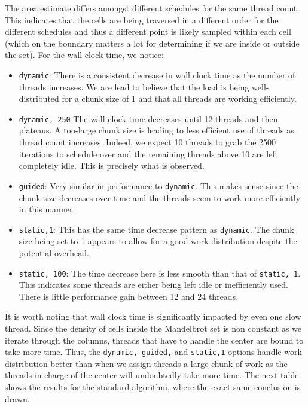 \documentclass{article}
\begin{document}
\noindent The area estimate differs amongst different schedules for the same thread count. This 
indicates that the cells are being traversed in a different order for the different schedules 
and thus a different point is likely sampled within each cell (which on the boundary matters 
a lot for determining if we are inside or outside the set). For the wall clock time, we notice:
\begin{itemize}
    \item \texttt{dynamic}: There is a consistent decrease in wall clock time as
    the number of threads increases. We are lead to believe that the load is 
    being well-distributed for a chunk size of 1 and that all threads are working efficiently.
    \item \texttt{dynamic, 250} The wall clock time decreases until 12 threads 
    and then plateaus. A too-large chunk size is leading to less efficient use of 
    threads as thread count increases. Indeed, we expect 10 threads to grab the 
    2500 iterations to schedule over and the remaining threads above 10 are left completely idle. This 
    is precisely what is observed.
    \item \texttt{guided}: Very similar in performance to \texttt{dynamic}. This 
    makes sense since the chunk size decreases over time and the threads seem 
    to work more efficiently in this manner.
    \item \texttt{static,1}: This has the same time decrease pattern as \texttt{dynamic}. 
    The chunk size being set to 1 appears to allow for a good work distribution despite the 
    potential overhead.
    \item \texttt{static, 100}: The time decrease here is less smooth than that of 
    \texttt{static, 1}. This indicates some threads are either being left idle or 
    inefficiently used. There is little performance gain between 12 and 24 threads.
\end{itemize}
It is worth noting that wall clock time is significantly impacted by even one slow thread. 
Since the density of cells inside the Mandelbrot set is non constant as we iterate through the columns, 
threads that have to handle the center are bound to take more time. Thus, the 
\texttt{dynamic, guided,} and \texttt{static,1} options handle work distribution better than 
when we assign threads a large chunk of work as the threads in charge of the center will undoubtedly take more time.
The next table shows the results for the standard algorithm, where the exact same conclusion is drawn.
\end{document}
